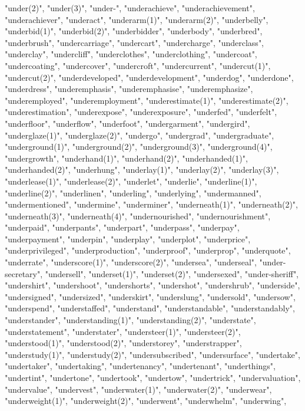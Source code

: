 "under(2)",
"under(3)",
"under-",
"underachieve",
"underachievement",
"underachiever",
"underact",
"underarm(1)",
"underarm(2)",
"underbelly",
"underbid(1)",
"underbid(2)",
"underbidder",
"underbody",
"underbred",
"underbrush",
"undercarriage",
"undercart",
"undercharge",
"underclass",
"underclay",
"undercliff",
"underclothes",
"underclothing",
"undercoat",
"undercoating",
"undercover",
"undercroft",
"undercurrent",
"undercut(1)",
"undercut(2)",
"underdeveloped",
"underdevelopment",
"underdog",
"underdone",
"underdress",
"underemphasis",
"underemphasise",
"underemphasize",
"underemployed",
"underemployment",
"underestimate(1)",
"underestimate(2)",
"underestimation",
"underexpose",
"underexposure",
"underfed",
"underfelt",
"underfloor",
"underflow",
"underfoot",
"undergarment",
"undergird",
"underglaze(1)",
"underglaze(2)",
"undergo",
"undergrad",
"undergraduate",
"underground(1)",
"underground(2)",
"underground(3)",
"underground(4)",
"undergrowth",
"underhand(1)",
"underhand(2)",
"underhanded(1)",
"underhanded(2)",
"underhung",
"underlay(1)",
"underlay(2)",
"underlay(3)",
"underlease(1)",
"underlease(2)",
"underlet",
"underlie",
"underline(1)",
"underline(2)",
"underlinen",
"underling",
"underlying",
"undermanned",
"undermentioned",
"undermine",
"underminer",
"underneath(1)",
"underneath(2)",
"underneath(3)",
"underneath(4)",
"undernourished",
"undernourishment",
"underpaid",
"underpants",
"underpart",
"underpass",
"underpay",
"underpayment",
"underpin",
"underplay",
"underplot",
"underprice",
"underprivileged",
"underproduction",
"underproof",
"underprop",
"underquote",
"underrate",
"underscore(1)",
"underscore(2)",
"undersea",
"underseal",
"under-secretary",
"undersell",
"underset(1)",
"underset(2)",
"undersexed",
"under-sheriff",
"undershirt",
"undershoot",
"undershorts",
"undershot",
"undershrub",
"underside",
"undersigned",
"undersized",
"underskirt",
"underslung",
"undersold",
"undersow",
"underspend",
"understaffed",
"understand",
"understandable",
"understandably",
"understander",
"understanding(1)",
"understanding(2)",
"understate",
"understatement",
"understater",
"understeer(1)",
"understeer(2)",
"understood(1)",
"understood(2)",
"understorey",
"understrapper",
"understudy(1)",
"understudy(2)",
"undersubscribed",
"undersurface",
"undertake",
"undertaker",
"undertaking",
"undertenancy",
"undertenant",
"underthings",
"undertint",
"undertone",
"undertook",
"undertow",
"undertrick",
"undervaluation",
"undervalue",
"undervest",
"underwater(1)",
"underwater(2)",
"underwear",
"underweight(1)",
"underweight(2)",
"underwent",
"underwhelm",
"underwing",
